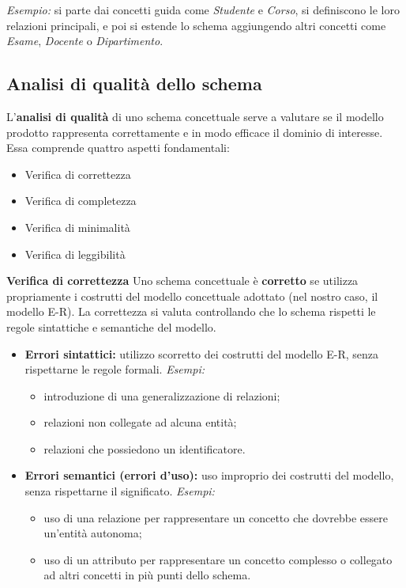 \begin{center}
\textit{Esempio:} si parte dai concetti guida come \textit{Studente} e \textit{Corso}, si definiscono le loro relazioni principali, e poi si estende lo schema aggiungendo altri concetti come \textit{Esame}, \textit{Docente} o \textit{Dipartimento}.
\end{center}

\subsection{Analisi di qualità dello schema}

L’\textbf{analisi di qualità} di uno schema concettuale serve a valutare se il modello prodotto rappresenta correttamente e in modo efficace il dominio di interesse.  
Essa comprende quattro aspetti fondamentali:
\begin{itemize}
  \item Verifica di correttezza
  \item Verifica di completezza
  \item Verifica di minimalità
  \item Verifica di leggibilità
\end{itemize}

\textbf{Verifica di correttezza}  
Uno schema concettuale è \textbf{corretto} se utilizza propriamente i costrutti del modello concettuale adottato (nel nostro caso, il modello E-R).  
La correttezza si valuta controllando che lo schema rispetti le regole sintattiche e semantiche del modello.

\begin{itemize}
  \item \textbf{Errori sintattici:} utilizzo scorretto dei costrutti del modello E-R, senza rispettarne le regole formali.  
  \textit{Esempi:}
  \begin{itemize}
    \item introduzione di una generalizzazione di relazioni;
    \item relazioni non collegate ad alcuna entità;
    \item relazioni che possiedono un identificatore.
  \end{itemize}
  
  \item \textbf{Errori semantici (errori d’uso):} uso improprio dei costrutti del modello, senza rispettarne il significato.  
  \textit{Esempi:}
  \begin{itemize}
    \item uso di una relazione per rappresentare un concetto che dovrebbe essere un’entità autonoma;
    \item uso di un attributo per rappresentare un concetto complesso o collegato ad altri concetti in più punti dello schema.
  \end{itemize}
\end{itemize}

